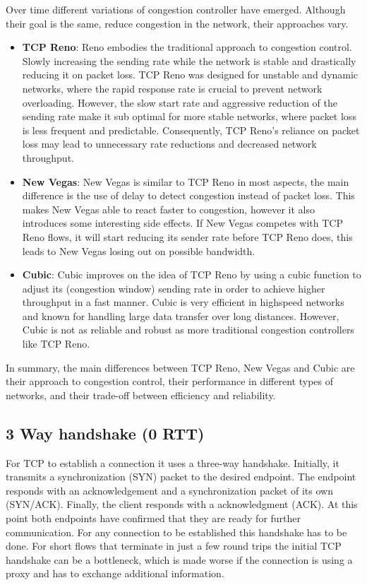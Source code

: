 \documentclass[a4paper,english, 11pt]{report}
\begin{document}
Over time different variations of congestion controller have emerged. Although their goal is the same, reduce congestion in the network, their approaches vary. 

\begin{itemize}
  \item \textbf{TCP Reno}: Reno embodies the traditional approach to congestion control. Slowly increasing the sending rate while the network is stable and drastically reducing it on packet loss. TCP Reno was designed for unstable and dynamic networks, where the rapid response rate is crucial to prevent network overloading. However, the slow start rate and aggressive reduction of the sending rate make it sub optimal for more stable networks, where packet loss is less frequent and predictable. Consequently, TCP Reno's reliance on packet loss may lead to unnecessary rate reductions and decreased network throughput.
  \item \textbf{New Vegas}: New Vegas is similar to TCP Reno in most aspects, the main difference is the use of delay to detect congestion instead of packet loss. This makes New Vegas able to react faster to congestion, however it also introduces some interesting side effects. If New Vegas competes with TCP Reno flows, it will start reducing its sender rate before TCP Reno does, this leads to New Vegas losing out on possible bandwidth. 
  \item \textbf{Cubic}: Cubic improves on the idea of TCP Reno by using a cubic function to adjust its (congestion window) sending rate in order to achieve higher throughput in a fast manner. Cubic is very efficient in highspeed networks and known for handling large data transfer over long distances. However, Cubic is not as reliable and robust as more traditional congestion controllers like TCP Reno.
\end{itemize}

In summary, the main differences between TCP Reno, New Vegas and Cubic are their approach to congestion control, their performance in different types of networks, and their trade-off between efficiency and reliability.

\subsection{3 Way handshake (0 RTT)}
For TCP to establish a connection it uses a three-way handshake. Initially, it transmits a synchronization (SYN) packet to the desired endpoint. The endpoint responds with an acknowledgement and a synchronization packet of its own (SYN/ACK). Finally, the client responds with a acknowledgment (ACK). At this point both endpoints have confirmed that they are ready for further communication. For any connection to be established this handshake has to be done. For short flows that terminate in just a few round trips the initial TCP handshake can be a bottleneck, which is made worse if the connection is using a proxy and has to exchange additional information. 
\end{document}
